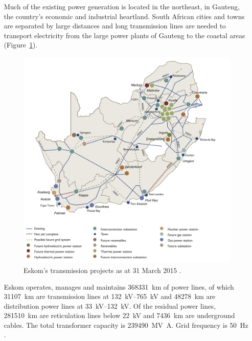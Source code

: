 Much of the existing power generation is located in the northeast, in Gauteng, the country's economic and industrial heartland. South African cities and towns are separated by large distances and long transmission lines are needed to transport electricity from the large power plants of Gauteng to the coastal areas (Figure~\ref{transmissionprojekts}). 

\begin{figure}[htbp]
\centering
\includegraphics[width=1\linewidth]{FIG/transmissionprojekts}
\caption[Eskom’s transmission projects as at 31 March 2015.]{Eskom’s transmission projects as at 31 March 2015 \cite{Eskom2015a}.}\label{transmissionprojekts}
\end{figure}
Eskom operates, manages and maintains \SI{368331}{\kilo\meter} of power lines, of which \SI{31107}{\kilo\meter} are transmission lines at \SIrange{132}{765}{\kilo\volt} and \SI{48278}{\kilo\meter} are distribution power lines at \SIrange{33}{132}{\kilo\volt}. Of the residual power lines, \SI{281510}{\kilo\meter} are reticulation lines below \SI{22}{\kilo\volt} and \SI{7436}{\kilo\meter} are underground cables. The total transformer capacity is \SI{239490}{\mega\volt\ampere}. Grid frequency is \SI{50}{\hertz} \cite{Eskom2015b}.

